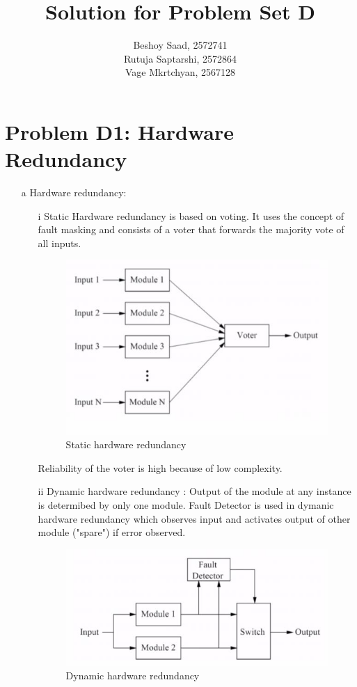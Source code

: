 \documentclass[]{article}
\title{Solution for Problem Set D}
\author{
	Beshoy Saad, 2572741\\
	Rutuja Saptarshi, 2572864\\
	Vage Mkrtchyan, 2567128
}
\begin{document}
\maketitle

\section{Problem D1: Hardware Redundancy}
\begin{itemize}
	\item[a] Hardware redundancy:
	\begin{itemize}
			\item[i]Static Hardware redundancy is based on voting. It uses the concept of fault masking and consists of a voter that forwards the majority vote of all inputs.
		\begin{figure}[h]
			\centering
			\includegraphics{Static}  
			\caption{Static hardware redundancy}
		\end{figure}
		
		
		Reliability of the voter is high because of low complexity.
		\item[ii] Dynamic hardware redundancy : Output of the module at any instance is determibed by only one module. Fault Detector is used in dymanic hardware redundancy which observes input and activates output of other module ("spare") if error observed.
		\begin{figure}[h]
			\centering
			\includegraphics{Dynamic}  
			\caption{Dynamic hardware redundancy}
		\end{figure}
	\end{itemize}


\end{itemize}
\end{document}
